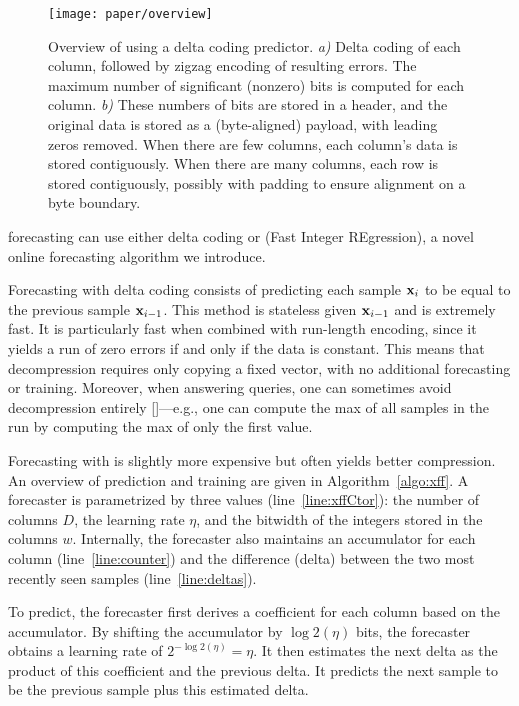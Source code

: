 \begin{figure*}[t]
\begin{center}
    \texttt{[image: paper/overview]}
    \caption{Overview of \mine\text{ }using a delta coding predictor.\textit{ a)} Delta coding of each column, followed by zigzag encoding of resulting errors. The maximum number of significant (nonzero) bits is computed for each column. \textit{b)} These numbers of bits are stored in a header, and the original data is stored as a (byte-aligned) payload, with leading zeros removed. When there are few columns, each column's data is stored contiguously. When there are many columns, each row is stored contiguously, possibly with padding to ensure alignment on a byte boundary.}
    \label{fig:overview}
\end{center}
\end{figure*}

\minesp forecasting can use either delta coding or \fire (Fast Integer REgression), a novel online forecasting algorithm we introduce.

Forecasting with delta coding consists of predicting each sample $\mathbf{x}_i$ to be equal to the previous sample $\mathbf{x}_{i-1}$. This method is stateless given $\mathbf{x}_{i-1}$ and is extremely fast. It is particularly fast when combined with run-length encoding, since it yields a run of zero errors if and only if the data is constant. This means that decompression requires only copying a fixed vector, with no additional forecasting or training. Moreover, when answering queries, one can sometimes avoid decompression entirely []---e.g., one can compute the max of all samples in the run by computing the max of only the first value.

Forecasting with \fire is slightly more expensive but often yields better compression. An overview of \fire prediction and training are given in Algorithm~\ref{algo:xff}. A \fire forecaster is parametrized by three values (line~\ref{line:xffCtor}): the number of columns $D$, the learning rate $\eta$, and the bitwidth of the integers stored in the columns $w$. Internally, the forecaster also maintains an accumulator for each column (line~\ref{line:counter}) and the difference (delta) between the two most recently seen samples (line~\ref{line:deltas}).

To predict, the forecaster first derives a coefficient for each column based on the accumulator. By shifting the accumulator by $\log2(\eta)$ bits, the forecaster obtains a learning rate of $2^{-\log2(\eta)} = \eta$. It then estimates the next delta as the product of this coefficient and the previous delta. It predicts the next sample to be the previous sample plus this estimated delta.

